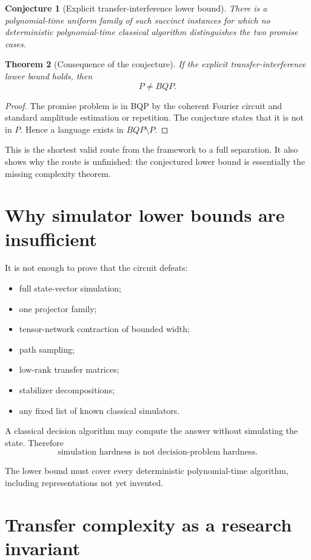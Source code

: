 \documentclass[11pt]{article}
\newtheorem{theorem}{Theorem}[section]
\newtheorem{conjecture}[theorem]{Conjecture}
\begin{document}
\begin{conjecture}[Explicit transfer-interference lower bound]
There is a polynomial-time uniform family of such succinct instances for which no deterministic polynomial-time classical algorithm distinguishes the two promise cases.
\end{conjecture}

\begin{theorem}[Consequence of the conjecture]
If the explicit transfer-interference lower bound holds, then
\[
        P\ne BQP.
\]
\end{theorem}

\begin{proof}
The promise problem is in BQP by the coherent Fourier circuit and standard amplitude estimation or repetition.  The conjecture states that it is not in $P$.  Hence a language exists in $BQP\setminus P$.
\end{proof}

This is the shortest valid route from the framework to a full separation.  It also shows why the route is unfinished: the conjectured lower bound is essentially the missing complexity theorem.

\section{Why simulator lower bounds are insufficient}

It is not enough to prove that the circuit defeats:
\begin{itemize}
\item full state-vector simulation;
\item one projector family;
\item tensor-network contraction of bounded width;
\item path sampling;
\item low-rank transfer matrices;
\item stabilizer decompositions;
\item any fixed list of known classical simulators.
\end{itemize}
A classical decision algorithm may compute the answer without simulating the state.  Therefore
\[
        \boxed{\text{simulation hardness is not decision-problem hardness}.}
\]

The lower bound must cover every deterministic polynomial-time algorithm, including representations not yet invented.

\section{Transfer complexity as a research invariant}
\end{document}

